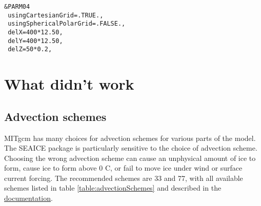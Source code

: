 \documentclass[11pt]{article}
\begin{document}
\begin{lstlisting}[caption={Sample grid namelist data}, label={listing:gridExample}]
 &PARM04
 usingCartesianGrid=.TRUE.,
 usingSphericalPolarGrid=.FALSE.,
 delX=400*12.50,
 delY=400*12.50,
 delZ=50*0.2,
\end{lstlisting}





\section{What didn't work}




\subsection{Advection schemes}
MITgcm has many choices for advection schemes for various parts of the model. The SEAICE package is particularly sensitive to the choice of advection scheme. Choosing the wrong advection scheme can cause an unphysical amount of ice to form, cause ice to form above 0 C, or fail to move ice under wind or surface current forcing. The recommended schemes are 33 and 77, with all available schemes listed in table \ref{table:advectionSchemes} and described in the \href{https://mitgcm.readthedocs.io/en/latest/algorithm/algorithm.html#comparison-of-advection-schemes}{documentation}.
\end{document}
